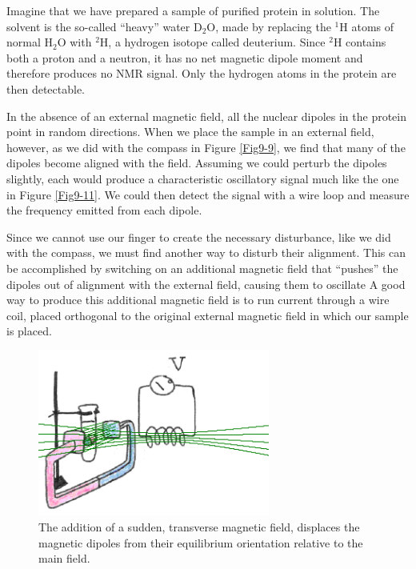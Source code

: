 Imagine that we have prepared a sample of purified protein in solution.  The solvent is the so-called ``heavy'' water D$_2$O, made by replacing the $^1$H atoms of normal H$_2$O with $^2$H, a hydrogen isotope called deuterium.  Since $^2$H contains both a proton and a neutron, it has no net magnetic dipole moment and therefore produces no NMR signal.  Only the hydrogen atoms in the protein are then detectable.

In the absence of an external magnetic field, all the nuclear dipoles in the protein point in random directions.  When we place the sample in an external field, however, as we did with the compass in Figure \ref{Fig9-9}, we find that many of the dipoles become aligned with the field.  Assuming we could perturb the dipoles slightly, each would produce a characteristic oscillatory signal much like the one in Figure \ref{Fig9-11}.  We could then detect the signal with a wire loop and measure the frequency emitted from each dipole.

Since we cannot use our finger to create the necessary disturbance, like we did with the compass, we must find another way to disturb their alignment.  This can be  accomplished by switching on an additional magnetic field that ``pushes'' the dipoles out of alignment with the external field, causing them to oscillate  A good way to produce this additional magnetic field is to run current through a wire coil, placed orthogonal to the original external magnetic field in which our sample is placed.  
\begin{figure}[h]
	\centering
	\includegraphics[width=3.0in]{./figures/Topic9/Fig9-14.png}
	\caption{The addition of a sudden, transverse magnetic field,  displaces the magnetic dipoles from their equilibrium orientation relative to the main field.}
 	\label{Fig9-14}
\end{figure} 


